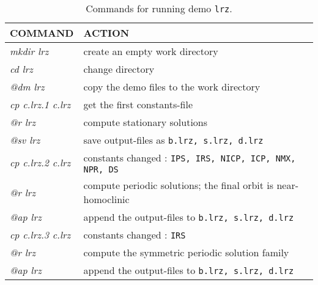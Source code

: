 \documentclass[12pt]{report}
\begin{document}
\begin{table}[htbp]
\begin{center}
\begin{tabular}{| l | l |}
\hline
  COMMAND  & ACTION \\
\hline

  {\it mkdir lrz} & create an empty work directory \\ 
  {\it cd lrz} & change directory \\
  {\it @dm lrz} & copy the demo files to the work directory \\
\hline
  {\it cp c.lrz.1 c.lrz} & get the first constants-file \\ 
  {\it @r lrz} & compute stationary solutions \\ 
  {\it @sv lrz} & save output-files as {\tt b.lrz, s.lrz, d.lrz} \\ 
\hline
  {\it cp c.lrz.2 c.lrz} & constants changed : {\tt IPS, IRS, NICP, ICP, NMX, NPR, DS} \\ 
  {\it @r lrz} & compute periodic solutions; the final orbit is near-homoclinic \\ 
  {\it @ap lrz} & append the output-files to {\tt b.lrz, s.lrz, d.lrz} \\ 
\hline
  {\it cp c.lrz.3 c.lrz} & constants changed : {\tt IRS} \\ 
  {\it @r lrz} & compute the symmetric periodic solution family \\ 
  {\it @ap lrz} & append the output-files to {\tt b.lrz, s.lrz, d.lrz} \\ 
\hline
\end{tabular}
\caption{Commands for running demo {\tt lrz}.}
\label{tbl:demo_lrz}
\end{center}
\end{table}

\newpage
\end{document}
